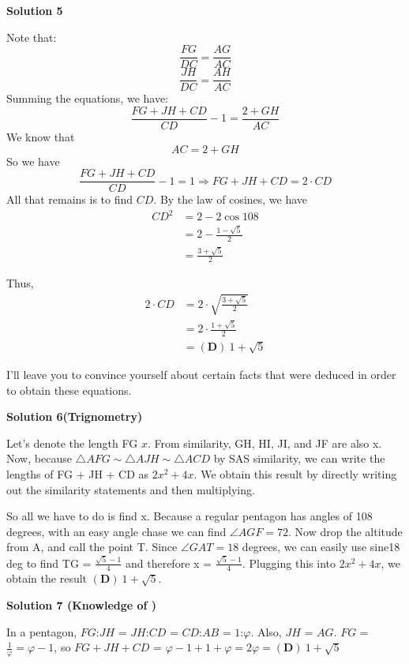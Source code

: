 \begin{enumerate}
 



\textbf{Solution 5}

Note that: 
 \[\frac{FG}{DC}=\frac{AG}{AC}\]
 \[\frac{JH}{DC}=\frac{AH}{AC}\]Summing the equations, we have:
 \[\frac{FG + JH + CD}{CD} - 1 = \frac{2 + GH}{AC}\]We know that 
 \[AC = 2 + GH\]So we have
 \[\frac{FG+JH+CD}{CD} - 1 = 1 \Rightarrow FG + JH + CD = 2 \cdot CD\]All that remains is to find $CD.$ By the law of cosines, we have
 \begin{align*} CD^2 &= 2 - 2 \cos 108\\ &= 2 - \frac{1 - \sqrt{5}}{2} \\ &= \frac{3 + \sqrt{5}}{2} \end{align*}


 Thus, 
 \begin{align*} 2 \cdot CD &= 2 \cdot \sqrt{\frac{3 + \sqrt{5}}{2}} \\ &= 2 \cdot \frac{1 + \sqrt{5}}{2} \\ &= \boxed{\mathbf{(D)}\ 1 + \sqrt{5}} \end{align*}


 I'll leave you to convince yourself about certain facts that were deduced in order to obtain these equations.

 



\textbf{Solution 6(Trignometry)}

Let's denote the length FG $x$. From similarity, GH, HI, JI, and JF are also x. Now, because $\triangle AFG \sim \triangle AJH \sim \triangle ACD$ by SAS similarity, we can write the lengths of FG + JH + CD as $2x^2+4x$. We obtain this result by directly writing out the similarity statements and then multiplying. 

 So all we have to do is find x. Because a regular pentagon has angles of 108 degrees, with an easy angle chase we can find $\angle AGF = 72$. Now drop the altitude from A, and call the point T. Since $\angle GAT = 18$ degrees, we can easily use sine18 deg to find TG = $\frac{\sqrt{5}-1}{4}$ and therefore x = $\frac{\sqrt{5}-1}{4}$. Plugging this into $2x^2+4x$, we obtain the result $\boxed{\mathbf{(D)}\ 1 + \sqrt{5}}$.

 



\textbf{Solution 7 (Knowledge of )}

In a pentagon, $FG$:$JH$ = $JH$:$CD$ = $CD$:$AB$ = $1$:$\varphi$. Also, $JH$ = $AG$. $FG$ = $\frac{1}{\varphi} = \varphi-1$, so $FG+JH+CD$ = $\varphi-1+1+\varphi = 2\varphi = \boxed{(\textbf{D})~1+\sqrt{5}}$


\end{enumerate}
